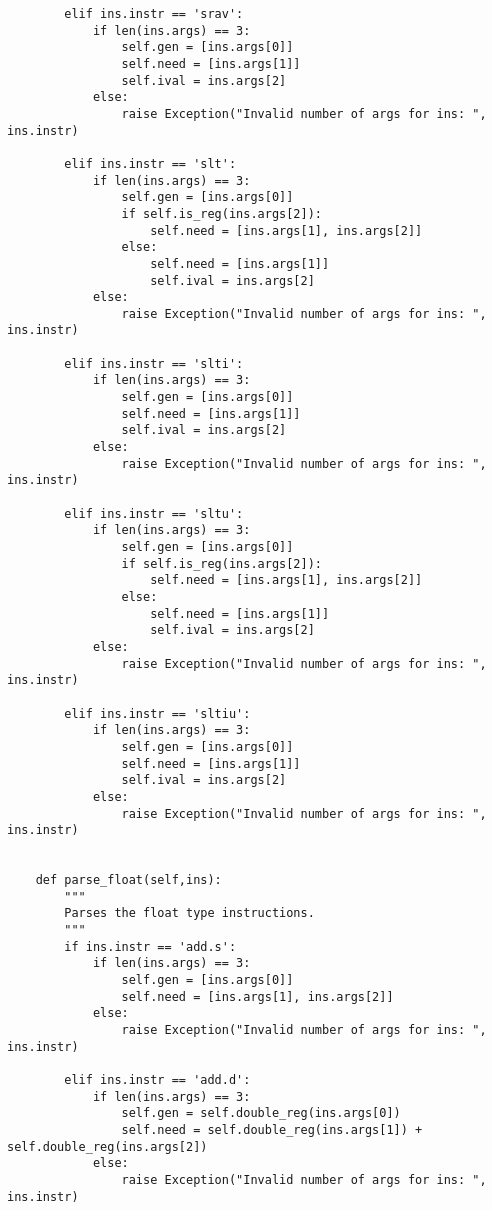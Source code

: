 \begin{lstlisting}
        elif ins.instr == 'srav': 
            if len(ins.args) == 3:
                self.gen = [ins.args[0]]
                self.need = [ins.args[1]]
                self.ival = ins.args[2]
            else:
                raise Exception("Invalid number of args for ins: ", ins.instr)  
                        
        elif ins.instr == 'slt':  
            if len(ins.args) == 3:
                self.gen = [ins.args[0]]
                if self.is_reg(ins.args[2]):
                    self.need = [ins.args[1], ins.args[2]]
                else: 
                    self.need = [ins.args[1]]
                    self.ival = ins.args[2]
            else:
                raise Exception("Invalid number of args for ins: ", ins.instr)  
                        
        elif ins.instr == 'slti': 
            if len(ins.args) == 3:
                self.gen = [ins.args[0]]
                self.need = [ins.args[1]]
                self.ival = ins.args[2]
            else:
                raise Exception("Invalid number of args for ins: ", ins.instr)           
                
        elif ins.instr == 'sltu':  
            if len(ins.args) == 3:
                self.gen = [ins.args[0]]
                if self.is_reg(ins.args[2]):
                    self.need = [ins.args[1], ins.args[2]]
                else: 
                    self.need = [ins.args[1]]
                    self.ival = ins.args[2]
            else:
                raise Exception("Invalid number of args for ins: ", ins.instr)        
                  
        elif ins.instr == 'sltiu':
            if len(ins.args) == 3:
                self.gen = [ins.args[0]]
                self.need = [ins.args[1]]
                self.ival = ins.args[2]
            else:
                raise Exception("Invalid number of args for ins: ", ins.instr)           
   

    def parse_float(self,ins):
        """
        Parses the float type instructions.
        """
        if ins.instr == 'add.s':   
            if len(ins.args) == 3:
                self.gen = [ins.args[0]]
                self.need = [ins.args[1], ins.args[2]]
            else:
                raise Exception("Invalid number of args for ins: ", ins.instr)  
                        
        elif ins.instr == 'add.d':   
            if len(ins.args) == 3:
                self.gen = self.double_reg(ins.args[0])
                self.need = self.double_reg(ins.args[1]) + self.double_reg(ins.args[2])
            else:
                raise Exception("Invalid number of args for ins: ", ins.instr)
                        

\end{lstlisting}
